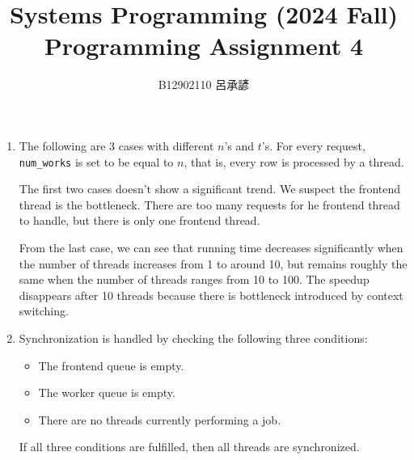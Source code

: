 \documentclass[12pt, a4paper]{article}
\title{%
  \vspace{-1.5cm}
  Systems Programming (2024 Fall)\\
  Programming Assignment 4
}
\author{\Large B12902110 呂承諺}
\date{}
\begin{document}
  \maketitle
  \begin{enumerate}
    \item The following are 3 cases with different $n$'s and $t$'s.
    For every request, \verb|num_works| is set to be equal to $n$, that is, every row is processed by a thread.

    \pgfplotsset{
      xlabel=Number of threads,
      ylabel=Running time (s),
    }
    \hfill

    \begin{center}
    \end{center}


    The first two cases doesn't show a significant trend. We suspect the
    frontend thread is the bottleneck.
    There are too many requests for he frontend thread to handle, but there is
    only one frontend thread.

    From the last case, we can see that running time decreases significantly
    when the number of threads increases from 1 to around 10, but remains
    roughly the same when the number of threads ranges from 10 to 100.
    The speedup disappears after 10 threads because there is bottleneck
    introduced by context switching.

    \pagebreak
    \item Synchronization is handled by checking the following
    three conditions:
    \begin{itemize}
      \item The frontend queue is empty.
      \item The worker queue is empty.
      \item There are no threads currently performing a job.
    \end{itemize}
    If all three conditions are fulfilled, then all threads are
    synchronized.


\end{enumerate}
\end{document}
